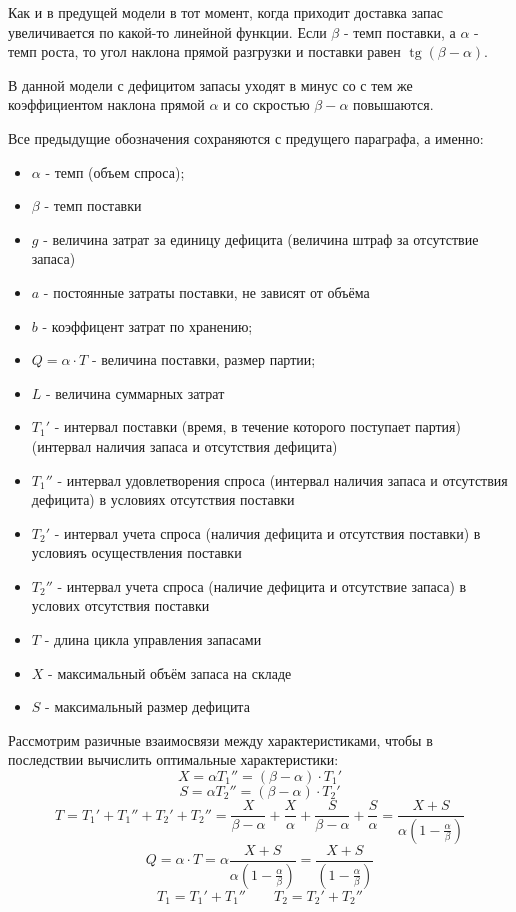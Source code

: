 \documentclass[aps,%
12pt,%
final,%
oneside,
onecolumn,%
musixtex, %
superscriptaddress,%
centertags]{article} %
\theoremstyle{plain}
\theoremstyle{definition}
\theoremstyle{remark}
\begin{document}
Как и в предущей модели в тот момент, когда приходит доставка запас увеличивается по какой-то линейной функции. Если $\beta$ - темп поставки, а $\alpha$ - темп роста, то угол наклона прямой разгрузки и поставки равен $\operatorname{tg} (\beta-\alpha)$.

В данной модели с дефицитом запасы уходят в минус со с тем же коэффициентом наклона прямой $\alpha$ и со скростью $\beta-\alpha$ повышаются.

Все предыдущие обозначения сохраняются с предущего параграфа, а именно:
\begin{itemize}
	\item $\alpha$ - темп (объем спроса);
	\item $\beta$ - темп поставки
	\item $g$ - величина затрат за единицу дефицита (величина штраф за отсутствие запаса)
	\item $a$ - постоянные затраты поставки, не зависят от объёма
	\item $b$ - коэффицент затрат по хранению;
	\item $Q = \alpha \cdot T$ - величина поставки, размер партии;
	\item $L$ - величина суммарных затрат
	\item $T_1'$ - интервал поставки (время, в течение которого поступает партия) (интервал наличия запаса и отсутствия дефицита)
	\item $T_1''$ - интервал удовлетворения спроса (интервал наличия запаса и отсутствия дефицита) в условиях отсутствия поставки
	\item $T_2'$ - интервал учета спроса (наличия дефицита и отсутствия поставки) в условияъ осуществления поставки
	\item $T_2''$ - интервал учета спроса (наличие дефицита и отсутствие запаса) в услових отсутствия поставки
	\item $T$ - длина цикла управления запасами
	\item $X$ - максимальный объём запаса на складе
	\item $S$ - максимальный размер дефицита
\end{itemize}

Рассмотрим разичные взаимосвязи между характеристиками, чтобы в последствии вычислить оптимальные характеристики:
$$X = \alpha T_1'' = (\beta-\alpha) \cdot T_1'$$
$$ S = \alpha T_2'' = (\beta-\alpha) \cdot T_2'$$
$$T = T_1' + T_1'' + T_2' + T_2'' = \frac{X}{\beta-\alpha} + \frac{X}{\alpha} + \frac{S}{\beta-\alpha} + \frac{S}{\alpha} = \frac{X+S}{\alpha \left(1-\frac{\alpha}{\beta}\right)}$$
$$Q = \alpha \cdot T = \alpha \frac{X+S}{\alpha \left(1-\frac{\alpha}{\beta}\right)} = \frac{X+S}{\left(1-\frac{\alpha}{\beta}\right)}$$
$$T_1 =T_1' + T_1'' \qquad T_2 = T_2' + T_2''$$
\end{document}
